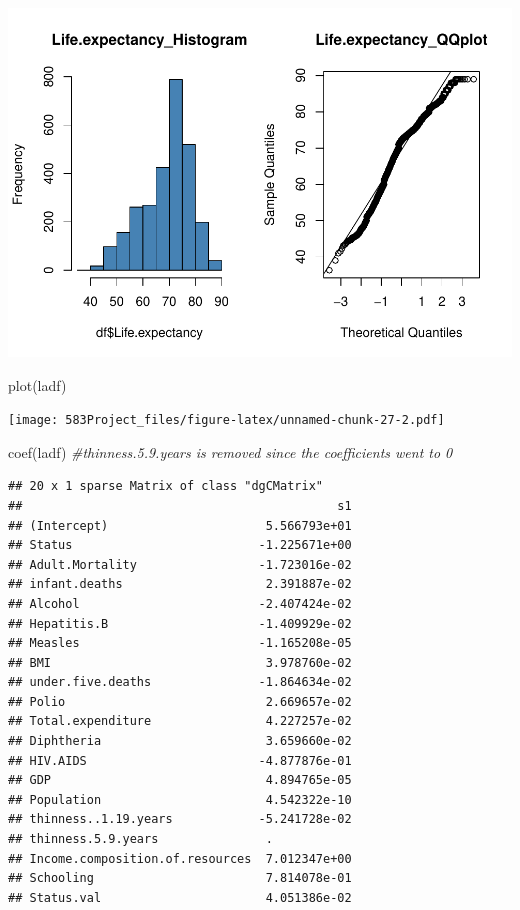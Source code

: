\documentclass[
]{article}
\newenvironment{Shaded}{\begin{snugshade}}{\end{snugshade}}
\newcommand{\CommentTok}[1]{\textcolor[rgb]{0.56,0.35,0.01}{\textit{#1}}}
\newcommand{\FunctionTok}[1]{\textcolor[rgb]{0.00,0.00,0.00}{#1}}
\newcommand{\NormalTok}[1]{#1}
\begin{document}
\includegraphics{583Project_files/figure-latex/unnamed-chunk-27-1.pdf}

\begin{Shaded}
\begin{Highlighting}[]
\FunctionTok{plot}\NormalTok{(ladf)}
\end{Highlighting}
\end{Shaded}

\texttt{[image: 583Project\_files/figure-latex/unnamed-chunk-27-2.pdf]}

\begin{Shaded}
\begin{Highlighting}[]
\FunctionTok{coef}\NormalTok{(ladf) }\CommentTok{\#thinness.5.9.years is removed since the coefficients went to 0}
\end{Highlighting}
\end{Shaded}

\begin{verbatim}
## 20 x 1 sparse Matrix of class "dgCMatrix"
##                                            s1
## (Intercept)                      5.566793e+01
## Status                          -1.225671e+00
## Adult.Mortality                 -1.723016e-02
## infant.deaths                    2.391887e-02
## Alcohol                         -2.407424e-02
## Hepatitis.B                     -1.409929e-02
## Measles                         -1.165208e-05
## BMI                              3.978760e-02
## under.five.deaths               -1.864634e-02
## Polio                            2.669657e-02
## Total.expenditure                4.227257e-02
## Diphtheria                       3.659660e-02
## HIV.AIDS                        -4.877876e-01
## GDP                              4.894765e-05
## Population                       4.542322e-10
## thinness..1.19.years            -5.241728e-02
## thinness.5.9.years               .           
## Income.composition.of.resources  7.012347e+00
## Schooling                        7.814078e-01
## Status.val                       4.051386e-02
\end{verbatim}
\end{document}

